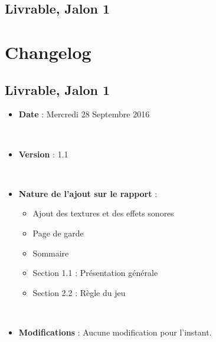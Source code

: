 \documentclass[12pt,a4paper]{report}
\begin{document}
	\section{Livrable, Jalon 1}
    
    \chapter{Changelog}
    \section{Livrable, Jalon 1}
    \begin{itemize}
\item \textbf{Date}  : Mercredi 28 Septembre 2016

\par\leavevmode\
\item \textbf{Version}  : 1.1

\par\leavevmode\
\item \textbf{Nature de l'ajout sur le rapport}  : \begin{itemize}\item Ajout des textures et des effets sonores \item Page de garde \item Sommaire \item Section 1.1 : Présentation générale \item Section 2.2 : Règle du jeu \end{itemize}

\par\leavevmode\
\item \textbf{Modifications}  : Aucune modification pour l'instant.\end{itemize}
    
    
\end{document}
